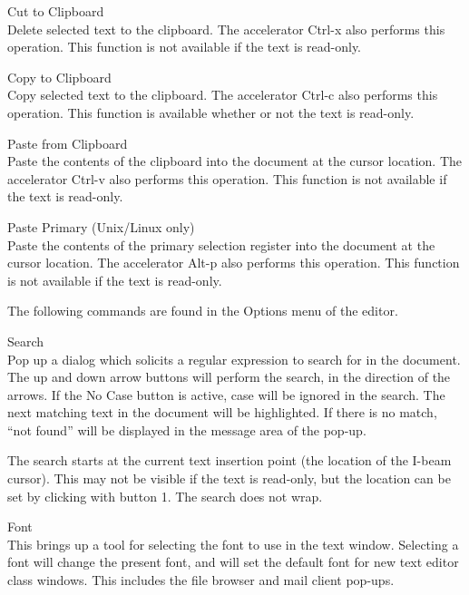 \begin{description}
\item{\cb Cut to Clipboard}\\
Delete selected text to the clipboard.  The accelerator {\kb Ctrl-x}
also performs this operation.  This function is not available if the
text is read-only.

\item{\cb Copy to Clipboard}\\
Copy selected text to the clipboard.  The accelerator {\kb Ctrl-c}
also performs this operation.  This function is available whether or
not the text is read-only.

\item{\cb Paste from Clipboard}\\
Paste the contents of the clipboard into the document at the cursor
location.  The accelerator {\kb Ctrl-v} also performs this operation. 
This function is not available if the text is read-only.

\item{\cb Paste Primary} (Unix/Linux only)\\
Paste the contents of the primary selection register into the document
at the cursor location.  The accelerator {\kb Alt-p} also performs
this operation.  This function is not available if the text is
read-only.
\end{description}

The following commands are found in the {\cb Options} menu of the
editor.

\begin{description}
\item{\cb Search}\\
Pop up a dialog which solicits a regular expression to search for in
the document.  The up and down arrow buttons will perform the search,
in the direction of the arrows.  If the {\cb No Case} button is
active, case will be ignored in the search.  The next matching text in
the document will be highlighted.  If there is no match, ``not found''
will be displayed in the message area of the pop-up.

The search starts at the current text insertion point (the location of
the I-beam cursor).  This may not be visible if the text is read-only,
but the location can be set by clicking with button 1.  The search
does not wrap.

\item{\cb Font}\\
This brings up a tool for selecting the font to use in the text
window.  Selecting a font will change the present font, and will set
the default font for new text editor class windows.  This includes the
file browser and mail client pop-ups.
\end{description}

